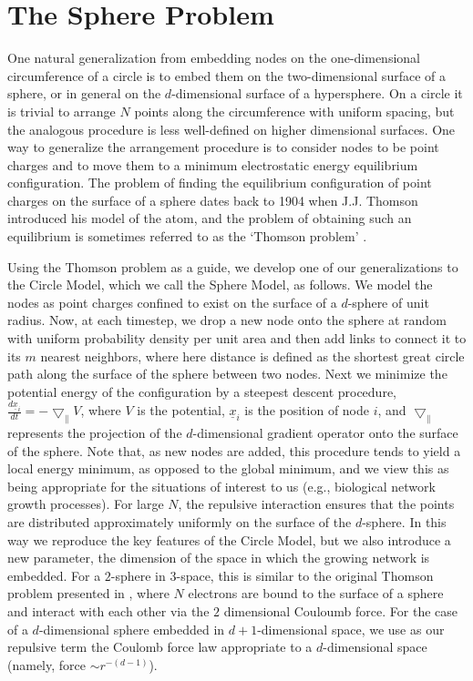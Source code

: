 \documentclass[aps,pre,reprint,superscriptaddress,amsmath,amssymb,nofootinbib]{revtex4-1}
\begin{document}
\section{The Sphere Problem}
One natural generalization from embedding nodes on the one-dimensional circumference of a circle is to embed them on the two-dimensional surface of a sphere, or in general on the $d$-dimensional surface of a hypersphere.
On a circle it is trivial to arrange $N$ points along the circumference with uniform spacing, but the analogous procedure is less well-defined on higher dimensional surfaces.
One way to generalize the arrangement procedure is to consider nodes to be point charges and to move them to a minimum electrostatic energy equilibrium configuration. 
The problem of finding the equilibrium configuration of point charges on the surface of a sphere dates back to 1904 when J.J. Thomson introduced his model of the atom, and the problem of obtaining such an equilibrium is sometimes referred to as the `Thomson problem' \cite{thomson1904}.

Using the Thomson problem as a guide, we develop one of our generalizations to the Circle Model, which we call the Sphere Model, as follows.
We model the nodes as point charges confined to exist on the surface of a $d$-sphere of unit radius.
Now, at each timestep, we drop a new node onto the sphere at random with uniform probability density per unit area and then add links to connect it to its $m$ nearest neighbors, where here distance is defined as the shortest great circle path along the surface of the sphere between two nodes.
Next we minimize the potential energy of the configuration by a steepest descent procedure, $\frac{d\underline{x}_i}{dt} = -\bigtriangledown_\parallel V$, where $V$ is the potential, $\underline{x}_i$ is the position of node $i$, and $\bigtriangledown_\parallel$ represents the projection of the $d$-dimensional gradient operator onto the surface of the sphere.
Note that, as new nodes are added, this procedure tends to yield a local energy minimum, as opposed to the global minimum, and we view this as being appropriate for the situations of interest to us (e.g., biological network growth processes).
For large $N$, the repulsive interaction ensures that the points are distributed approximately uniformly on the surface of the $d$-sphere.
In this way we reproduce the key features of the Circle Model, but we also introduce a new parameter, the dimension of the space in which the growing network is embedded.
For a $2$-sphere in $3$-space, this is similar to the original Thomson problem presented in \cite{thomson1904}, where $N$ electrons are bound to the surface of a sphere and interact with each other via the $2$ dimensional Couloumb force.
For the case of a $d$-dimensional sphere embedded in $d+1$-dimensional space, we use as our repulsive term the Coulomb force law appropriate to a $d$-dimensional space (namely, force $\sim r^{-(d-1)}$).
\end{document}
